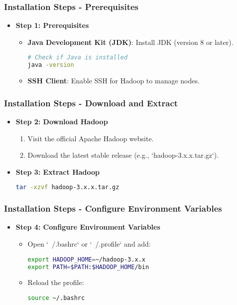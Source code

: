 \documentclass[aspectratio=169]{beamer}
\begin{document}
\begin{frame}[fragile]
    \frametitle{Installation Steps - Prerequisites}
    \begin{itemize}
        \item \textbf{Step 1: Prerequisites}
        \begin{itemize}
            \item \textbf{Java Development Kit (JDK)}: Install JDK (version 8 or later).
            \begin{lstlisting}[language=bash]
# Check if Java is installed
java -version
            \end{lstlisting}
            \item \textbf{SSH Client}: Enable SSH for Hadoop to manage nodes.
        \end{itemize}
    \end{itemize}
\end{frame}

\begin{frame}[fragile]
    \frametitle{Installation Steps - Download and Extract}
    \begin{itemize}
        \item \textbf{Step 2: Download Hadoop}
        \begin{enumerate}
            \item Visit the official Apache Hadoop website.
            \item Download the latest stable release (e.g., `hadoop-3.x.x.tar.gz`).
        \end{enumerate}
        \item \textbf{Step 3: Extract Hadoop}
        \begin{lstlisting}[language=bash]
tar -xzvf hadoop-3.x.x.tar.gz
        \end{lstlisting}
    \end{itemize}
\end{frame}

\begin{frame}[fragile]
    \frametitle{Installation Steps - Configure Environment Variables}
    \begin{itemize}
        \item \textbf{Step 4: Configure Environment Variables}
        \begin{itemize}
            \item Open `~/.bashrc` or `~/.profile` and add:
            \begin{lstlisting}[language=bash]
export HADOOP_HOME=~/hadoop-3.x.x
export PATH=$PATH:$HADOOP_HOME/bin
            \end{lstlisting}
            \item Reload the profile:
            \begin{lstlisting}[language=bash]
source ~/.bashrc
            \end{lstlisting}
        \end{itemize}
    \end{itemize}
\end{frame}
\end{document}
